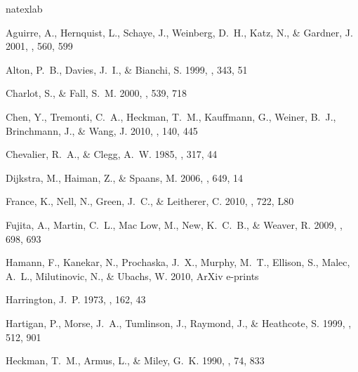 \documentclass[12pt,preprint]{aastex}
\begin{document}
\begin{thebibliography}{74}
\expandafter\ifx\csname natexlab\endcsname\relax\def\natexlab#1{#1}\fi

{Aguirre}, A., {Hernquist}, L., {Schaye}, J., {Weinberg}, D.~H., {Katz}, N., \&
  {Gardner}, J. 2001, \apj, 560, 599

{Alton}, P.~B., {Davies}, J.~I., \& {Bianchi}, S. 1999, \aap, 343, 51

{Charlot}, S., \& {Fall}, S.~M. 2000, \apj, 539, 718

{Chen}, Y., {Tremonti}, C.~A., {Heckman}, T.~M., {Kauffmann}, G., {Weiner},
  B.~J., {Brinchmann}, J., \& {Wang}, J. 2010, \aj, 140, 445

{Chevalier}, R.~A., \& {Clegg}, A.~W. 1985, \nat, 317, 44

{Dijkstra}, M., {Haiman}, Z., \& {Spaans}, M. 2006, \apj, 649, 14

{France}, K., {Nell}, N., {Green}, J.~C., \& {Leitherer}, C. 2010, \apjl, 722,
  L80

{Fujita}, A., {Martin}, C.~L., {Mac Low}, M., {New}, K.~C.~B., \& {Weaver}, R.
  2009, \apj, 698, 693

{Hamann}, F., {Kanekar}, N., {Prochaska}, J.~X., {Murphy}, M.~T., {Ellison},
  S., {Malec}, A.~L., {Milutinovic}, N., \& {Ubachs}, W. 2010, ArXiv e-prints

{Harrington}, J.~P. 1973, \mnras, 162, 43

{Hartigan}, P., {Morse}, J.~A., {Tumlinson}, J., {Raymond}, J., \& {Heathcote},
  S. 1999, \apj, 512, 901

{Heckman}, T.~M., {Armus}, L., \& {Miley}, G.~K. 1990, \apjs, 74, 833


\end{thebibliography}
\end{document}
